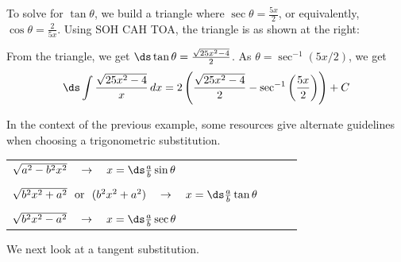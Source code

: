 \begin{solution}
\begin{minipage}{.6\textwidth}
To solve for $\tan\theta$, we build a triangle where $ \sec\theta = \frac{5x}{2} $, or equivalently, $\cos\theta=\frac{2}{5x}$.
Using SOH CAH TOA, the triangle is as shown at the right:  
\end{minipage}
\begin{minipage}{.4\textwidth}
\begin{center}
\end{center}
\end{minipage}
From the triangle, we get $ \ds \tan\theta = \frac{\sqrt{25x^2-4}}{2}  $.  
As $\theta=\sec^{-1}(5x/2)$, we get
$$\ds\int\frac{\sqrt{25x^2-4}}{x}\,dx=2\left(\frac{\sqrt{25x^2-4}}{2}-\sec^{-1}\left(\frac{5x}{2}\right)\right)+C$$
\end{solution}

In the context of the previous example, some resources give alternate guidelines when choosing a trigonometric substitution.
\begin{center}\begin{tabular}{@{}ll@{}ll@{}}
	$\sqrt{a^2-b^2x^2}\quad\to\quad x=\ds\frac{a}{b}\sin\theta$\\
	\vspace{-0.1cm}\\
	$\sqrt{b^2x^2+a^2}~~\mbox{or}~~(b^2x^2+a^2)\quad\to\quad x=\ds\frac{a}{b}\tan\theta$\\
	\vspace{-0.1cm}\\
	$\sqrt{b^2x^2-a^2}\quad\to\quad x=\ds\frac{a}{b}\sec\theta$\\
\end{tabular}\end{center}

We next look at a tangent substitution.


